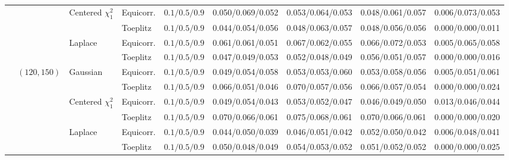 \begin{landscape}
\begin{longtable}{@{}lllllcccc@{}}
\cmidrule(lr){3-9}
 &  & Centered $\chi^2_1$ & Equicorr. & $0.1/0.5/0.9$ & 0.050/0.069/0.052 & 0.053/0.064/0.053 & 0.048/0.061/0.057 & 0.006/0.073/0.053 \\
\cmidrule(lr){4-9}
 &  &  & Toeplitz & $0.1/0.5/0.9$ & 0.044/0.054/0.056 & 0.048/0.063/0.057 & 0.048/0.056/0.056 & 0.000/0.000/0.011 \\
\cmidrule(lr){3-9}
 &  & Laplace & Equicorr. & $0.1/0.5/0.9$ & 0.061/0.061/0.051 & 0.067/0.062/0.055 & 0.066/0.072/0.053 & 0.005/0.065/0.058 \\
\cmidrule(lr){4-9}
 &  &  & Toeplitz & $0.1/0.5/0.9$ & 0.047/0.049/0.053 & 0.052/0.048/0.049 & 0.056/0.051/0.057 & 0.000/0.000/0.016 \\
\addlinespace[2pt]
 & $(120,150)$ & Gaussian & Equicorr. & $0.1/0.5/0.9$ & 0.049/0.054/0.058 & 0.053/0.053/0.060 & 0.053/0.058/0.056 & 0.005/0.051/0.061 \\
\cmidrule(lr){4-9}
 &  &  & Toeplitz & $0.1/0.5/0.9$ & 0.066/0.051/0.046 & 0.070/0.057/0.056 & 0.066/0.057/0.054 & 0.000/0.000/0.024 \\
\cmidrule(lr){3-9}
 &  & Centered $\chi^2_1$ & Equicorr. & $0.1/0.5/0.9$ & 0.049/0.054/0.043 & 0.053/0.052/0.047 & 0.046/0.049/0.050 & 0.013/0.046/0.044 \\
\cmidrule(lr){4-9}
 &  &  & Toeplitz & $0.1/0.5/0.9$ & 0.070/0.066/0.061 & 0.075/0.068/0.061 & 0.070/0.066/0.061 & 0.000/0.000/0.020 \\
\cmidrule(lr){3-9}
 &  & Laplace & Equicorr. & $0.1/0.5/0.9$ & 0.044/0.050/0.039 & 0.046/0.051/0.042 & 0.052/0.050/0.042 & 0.006/0.048/0.041 \\
\cmidrule(lr){4-9}
 &  &  & Toeplitz & $0.1/0.5/0.9$ & 0.050/0.048/0.049 & 0.054/0.053/0.052 & 0.051/0.052/0.052 & 0.000/0.000/0.025 \\
\bottomrule
\end{longtable}
\endgroup
\end{landscape}
